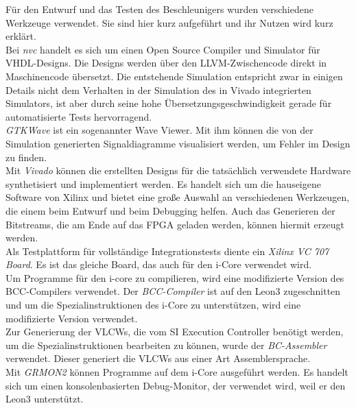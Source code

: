 Für den Entwurf und das Testen des Beschleunigers wurden verschiedene Werkzeuge verwendet.
Sie sind hier kurz aufgeführt und ihr Nutzen wird kurz erklärt. \\
Bei \textit{nvc} handelt es sich um einen Open Source Compiler und Simulator für VHDL-Designs.
Die Designs werden über den LLVM-Zwischencode direkt in Maschinencode übersetzt. Die entstehende
Simulation entspricht zwar in einigen Details nicht dem Verhalten in der Simulation des 
in Vivado integrierten Simulators, ist aber durch seine hohe Übersetzungsgeschwindigkeit
gerade für automatisierte Tests hervorragend. \\
\textit{GTKWave} ist ein sogenannter Wave Viewer. Mit ihm können die von der Simulation generierten
Signaldiagramme visualisiert werden, um Fehler im Design zu finden. \\
Mit \textit{Vivado} können die erstellten Designs für die tatsächlich verwendete Hardware synthetisiert und implementiert werden.
Es handelt sich um die hauseigene Software von Xilinx und bietet eine große Auswahl an verschiedenen Werkzeugen, die einem beim
Entwurf und beim Debugging helfen. Auch das Generieren der Bitstreams, die am Ende auf das FPGA geladen werden, können hiermit erzeugt werden. \\
Als Testplattform für vollständige Integrationstests diente ein \textit{Xilinx VC 707 Board}. Es ist das gleiche Board,
das auch für den i-Core verwendet wird. \\
Um Programme für den i-core zu compilieren, wird eine modifizierte Version des BCC-Compilers verwendet.
Der \textit{BCC-Compiler} ist auf den Leon3 zugeschnitten und um die Spezialinstruktionen des i-Core zu unterstützen,
wird eine modifizierte Version verwendet. \\
Zur Generierung der VLCWs, die vom SI Execution Controller benötigt werden, um die Spezialinstruktionen bearbeiten zu können,
wurde der \textit{BC-Assembler} verwendet. Dieser generiert die VLCWs aus einer Art Assemblersprache. \\
Mit \textit{GRMON2} können Programme auf dem i-Core ausgeführt werden. Es handelt sich um einen konsolenbasierten Debug-Monitor,
der verwendet wird, weil er den Leon3 unterstützt.